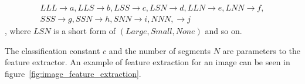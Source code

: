 \begin{enumerate}
\begin{enumerate}
    \begin{equation}\label{eq:class_triple_to_observation_symbol_mappings}
     \substack{ LLL\rightarrow a,LLS\rightarrow b,LSS\rightarrow c,LSN\rightarrow d,LLN\rightarrow e,LNN\rightarrow f,\\
    SSS\rightarrow g,SSN\rightarrow h,SNN\rightarrow i,NNN,\rightarrow j }
    \end{equation}
    , where $LSN$ is a short form of $(Large,Small,None)$ and so on.
  \end{enumerate}  
\end{enumerate}

The classification constant $c$ and the number of segments $N$ are parameters to the feature extractor. An example of feature extraction for an image can be seen in figure~\ref{fig:image_feature_extraction}.